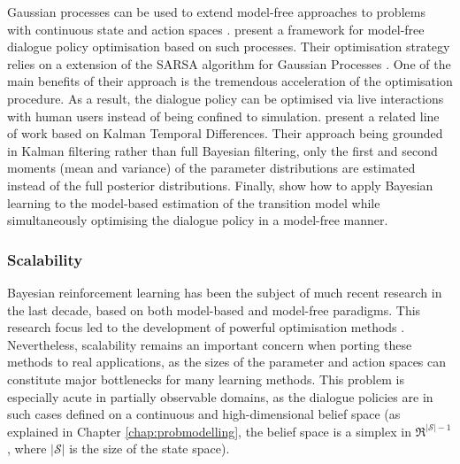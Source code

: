 Gaussian processes can be used to extend model-free approaches to problems with continuous state and action spaces \citep{Engel:2005}. \cite{milica2013} present a framework for model-free dialogue policy optimisation based on such processes. Their optimisation strategy relies on a extension of the SARSA algorithm for Gaussian Processes \citep{Engel:2005}. One of the main benefits of their approach is the tremendous acceleration of the optimisation procedure.  As a result, the dialogue policy can be optimised via live interactions with human users instead of being confined to simulation. \cite{Supelec808} present a related line of work based on Kalman Temporal Differences.  Their approach being grounded in Kalman filtering rather than full Bayesian filtering, only the first and second moments (mean and variance) of the parameter distributions  are estimated instead of the full posterior distributions.  Finally, \cite{DBLP:conf/slt/ThomsonJGKMYY10} show how to apply Bayesian learning to the model-based estimation of the transition model while simultaneously optimising the dialogue policy in a model-free manner. 






\subsubsection*{Scalability}

Bayesian reinforcement learning has been the subject of much recent research in the last decade, based on both model-based and model-free paradigms. This research focus led to the development of powerful optimisation methods \cite[see e.g.][for a detailed survey]{brl2012}. Nevertheless, scalability remains an important concern when porting these methods to real applications, as the sizes of the parameter and action spaces can  constitute major bottlenecks for many learning methods.  This problem is especially acute in partially observable domains, as the dialogue policies are in such cases defined on a continuous and high-dimensional belief space (as explained in Chapter \ref{chap:probmodelling}, the belief space is a simplex in $\Re^{|\mathcal{S}|-1}$, where $|\mathcal{S}|$ is the size of the state space).  

